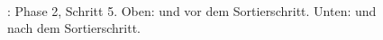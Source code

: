 \begin{figure}[H]
{\begin{minipage}{\textwidth}
        \hfill
        \\
    \end{minipage}}
    \caption[\bpr: Phase 2, Schritt 5]{\bpr: Phase 2, Schritt 5. Oben: \sa und \bptr vor dem Sortierschritt. Unten: \sa und \bptr nach dem Sortierschritt.}
    \label{bpr:p2s5}
\end{figure}
